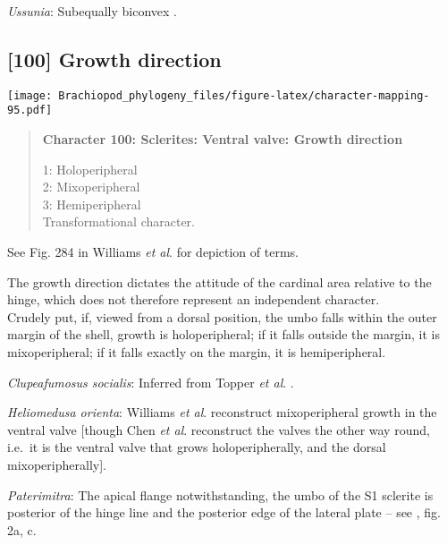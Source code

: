\documentclass[openany]{book}
\theoremstyle{definition}
\theoremstyle{definition}
\theoremstyle{definition}
\theoremstyle{remark}
\begin{document}
\hypertarget{Ussunia-coding-99}{}
\emph{Ussunia}: Subequally biconvex
\citep[p.~192]{Williams2000LinguliformeaCraniiformea}.

\subsection*{{[}100{]} Growth direction}\label{growth-direction-1}

\texttt{[image: Brachiopod\_phylogeny\_files/figure-latex/character-mapping-95.pdf]}

\begin{quote}
\textbf{Character 100: Sclerites: Ventral valve: Growth direction}

1: Holoperipheral\\
2: Mixoperipheral\\
3: Hemiperipheral\\
Transformational character.
\end{quote}

See Fig. 284 in Williams \emph{et al}.
\citeyearpar{Williams1997Introduction} for depiction of terms.

The growth direction dictates the attitude of the cardinal area relative
to the hinge, which does not therefore represent an independent
character.\\
Crudely put, if, viewed from a dorsal position, the umbo falls within
the outer margin of the shell, growth is holoperipheral; if it falls
outside the margin, it is mixoperipheral; if it falls exactly on the
margin, it is hemiperipheral.

\hypertarget{Clupeafumosus_socialis-coding-100}{}
\emph{Clupeafumosus socialis}: Inferred from Topper \emph{et al}.
\citeyearpar{Topper2013Reappraisalof}.

\hypertarget{Heliomedusa_orienta-coding-100}{}
\emph{Heliomedusa orienta}: Williams \emph{et al}.
\citeyearpar[2007]{Williams2000LinguliformeaCraniiformea} reconstruct
mixoperipheral growth in the ventral valve {[}though Chen \emph{et al}.
\citeyearpar{Chen2007Reinterpretationof} reconstruct the valves the
other way round, i.e.~it is the ventral valve that grows
holoperipherally, and the dorsal mixoperipherally{]}.

\hypertarget{Paterimitra-coding-100}{}
\emph{Paterimitra}: The apical flange notwithstanding, the umbo of the
S1 sclerite is posterior of the hinge line and the posterior edge of the
lateral plate -- see \citet{Larsson2014iPaterimitra}, fig. 2a, c.
\end{document}

